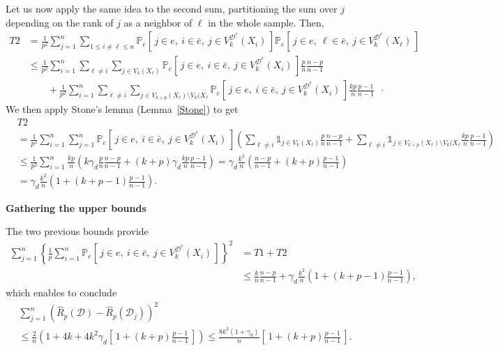 \documentclass[twoside,11pt]{article}
\numberwithin{equation}{section}
\newcommand{\gp}[1]{\left(#1\right)}
\newcommand{\ga}[1]{\left\{#1\right\}}
\newcommand{\1}{\mathds{1}}%
\newcommand{\paren}[1]{\left( #1 \right)}
\newcommand{\croch}[1]{\left[\, #1 \,\right]}
\renewcommand{\P}{\mathbb{P}}
\newcommand{\Rh}{\widehat{R}}
\newcommand{\Rhp}{\Rh_p}
\newcommand{\D}{\mathcal{D}}
\numberwithin{equation}{section}
\theoremstyle{plain}
\begin{document}
Let us now apply the same idea to the second sum, partitioning the sum over $j$ depending on the rank of $j$ as a neighbor of $\ell$ in the whole sample.
%
Then,
\begin{align*}
T2& =  \frac{1}{p^2}  \sum_{j=1}^{n}   \sum_{1\leq i\neq \ell \leq n}  \P_e\croch{j\in e,\ i\in \bar e,\ j \in V_k^{\D^e}(X_i)  }\P_e\croch{j\in e,\ \ell\in \bar e,\ j \in V_k^{\D^e}(X_{\ell}) } \\
%
& \leq   \frac{1}{p^2}  \sum_{i=1}^n  \sum_{\ell \neq i}   \sum_{j \in V_k(X_{\ell}) } \P_e\croch{j\in e,\ i\in \bar e,\ j \in V_k^{\D^e}(X_i)  }  \frac{p}{n}\frac{n-p}{n-1} \\
& \qquad +  \frac{1}{p^2}  \sum_{i=1}^n  \sum_{\ell \neq i}   \sum_{j \in V_{k+p}(X_{\ell})\setminus V_{k}(X_{\ell} } \P_e\croch{j\in e,\ i\in \bar e,\ j \in V_k^{\D^e}(X_i)  }   \frac{kp}{n}\frac{p-1}{n-1} \enspace\cdot
\end{align*}
%
We then apply Stone's lemma (Lemma~\ref{Stone}) to get
%
{\small
\begin{align*}
& T2 \\
%
& = \frac{1}{p^2}  \sum_{i=1}^n  \sum_{j=1}^n \P_e\croch{j\in e,\ i\in \bar e,\ j \in V_k^{\D^e}(X_i)  } \paren{ \sum_{\ell \neq i}   \1_{j \in V_k(X_{\ell}) }   \frac{p}{n}\frac{n-p}{n-1} + \sum_{\ell \neq i}   \1_{j \in V_{k+p}(X_{\ell})\setminus V_{k}(X_{\ell} }  \frac{kp}{n}\frac{p-1}{n-1} } \\
%
& \leq \frac{1}{p^2}  \sum_{i=1}^n  \frac{kp}{n} \paren{ k\gamma_d   \frac{p}{n}\frac{n-p}{n-1} + (k+p)\gamma_d \frac{kp}{n}\frac{p-1}{n-1} } =   \gamma_d \frac{k^2}{n} \paren{ \frac{n-p}{n-1} + (k+p)\frac{p-1}{n-1} }  \\
%
& =  \gamma_d \frac{k^2}{n} \paren{ 1 + (k+p-1)\frac{p-1}{n-1} } .
\end{align*}}


\noindent\textbf{Gathering the upper bounds}
%

The two previous bounds provide
\begin{align*}
\sum_{j=1}^{n}\ga{ \frac{1}{p} \sum_{i=1}^n \P_e\croch{j\in e,\ i\in \bar e,\ j \in V_k^{\D^e}(X_i)  } }^2 & = T1 + T2 \\
&\leq \frac{k}{n}   \frac{n-p}{n-1} + \gamma_d \frac{k^2}{n} \paren{ 1 + (k+p-1)\frac{p-1}{n-1} },
\end{align*}
%
which enables to conclude
\begin{align*}
& \sum_{j=1}^{n}\gp{  \Rh_p( \D )- \Rhp\paren{\D_j} }^2 \\
%
& \leq \frac{2}{n}\paren{1 + 4k + 4k^2\gamma_d \croch{1 + (k+p)\frac{p-1}{n-1}}} \leq \frac{8k^2 (1+\gamma_d )}{n}\croch{1 + (k+p)\frac{p-1}{n-1}} .
\end{align*}
%
\end{document}
